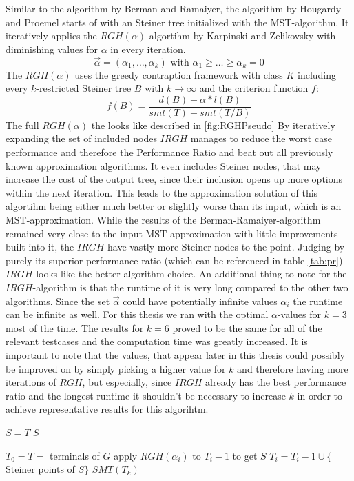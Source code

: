 Similar to the algorithm by Berman and Ramaiyer, the algorithm by Hougardy and Proemel \cite{HoPr99} starts of with an Steiner tree initialized with the MST-algorithm. It iteratively applies the $RGH(\alpha)$ algortihm by Karpinski and Zelikovsky \cite{karpinski1997new} with diminishing values for $\alpha$ in every iteration.$$\vec{\alpha}=(\alpha_1,\dots,\alpha_k) \text{ with } \alpha_1 \geq \dots \geq \alpha_k=0$$ 
The $RGH(\alpha)$ uses the greedy contraption framework \cite{karpinski1997new} with class $K$ including every $k$-restricted Steiner tree $B$ with $k\to\infty$ and the criterion function $f$: $$ f(B) = \frac{d(B) + \alpha * l(B)}{smt(T)-smt(T/B)} $$
The full $RGH(\alpha)$ the looks like described in \ref{fig:RGHPseudo}
By iteratively expanding the set of included nodes $IRGH$ manages to reduce the worst case performance and therefore the Performance Ratio and beat out all previously known approximation algorithms. It even includes Steiner nodes, that may increase the cost of the output tree, since their inclusion opens up more options within the next iteration. This leads to the approximation solution of this algortihm being either much better or slightly worse than its input, which is an MST-approximation.  While the results of the Berman-Ramaiyer-algorithm remained very close to the input MST-approximation with little improvements built into it, the $IRGH$ have vastly more Steiner nodes to the point. Judging by purely its superior performance ratio (which can be referenced in table \ref{tab:pr}) $IRGH$ looks like the better algorithm choice. An additional thing to note for the $IRGH$-algorithm is that the runtime of it is very long compared to the other two algorithms. Since the set $\vec{\alpha}$ could have potentially infinite values $\alpha_i$ the runtime can be infinite as well. For this thesis we ran with the optimal $\alpha$-values for $k=3$ most of the time. The results for $k=6$ proved to be the same for all of the relevant testcases and the computation time was greatly increased. It is important to note that the values, that appear later in this thesis could possibly be improved on by simply picking a higher value for $k$ and therefore having more iterations of $RGH$, but especially, since $IRGH$ already has the best performance ratio and the longest runtime it shouldn't be necessary to increase $k$ in order to achieve representative results for this algorihtm.  

\begin{algorithm}[hb]
$S=T$\;
 {
}
\KwRet $S$\;

\label{fig:RGHPseudo}
\end{algorithm}


\begin{algorithm}[hb]
$T_0=T=$ terminals of $G$\;
 {
	apply $RGH(\alpha_i)$ to $T_i-1$ to get $S$\;
	$T_i=T_i-1 \cup \{$Steiner points of $S\}$\;
}
\KwRet $SMT(T_k)$\;
\label{fig:IRGHPseudo}
\end{algorithm}

